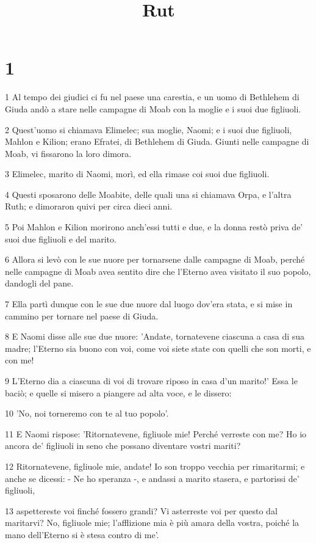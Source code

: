 

\title{Rut}


\chapter{1}

\par 1 Al tempo dei giudici ci fu nel paese una carestia, e un uomo di Bethlehem di Giuda andò a stare nelle campagne di Moab con la moglie e i suoi due figliuoli.
\par 2 Quest'uomo si chiamava Elimelec; sua moglie, Naomi; e i suoi due figliuoli, Mahlon e Kilion; erano Efratei, di Bethlehem di Giuda. Giunti nelle campagne di Moab, vi fissarono la loro dimora.
\par 3 Elimelec, marito di Naomi, morì, ed ella rimase coi suoi due figliuoli.
\par 4 Questi sposarono delle Moabite, delle quali una si chiamava Orpa, e l'altra Ruth; e dimoraron quivi per circa dieci anni.
\par 5 Poi Mahlon e Kilion morirono anch'essi tutti e due, e la donna restò priva de' suoi due figliuoli e del marito.
\par 6 Allora si levò con le sue nuore per tornarsene dalle campagne di Moab, perché nelle campagne di Moab avea sentito dire che l'Eterno avea visitato il suo popolo, dandogli del pane.
\par 7 Ella partì dunque con le sue due nuore dal luogo dov'era stata, e si mise in cammino per tornare nel paese di Giuda.
\par 8 E Naomi disse alle sue due nuore: 'Andate, tornatevene ciascuna a casa di sua madre; l'Eterno sia buono con voi, come voi siete state con quelli che son morti, e con me!
\par 9 L'Eterno dia a ciascuna di voi di trovare riposo in casa d'un marito!' Essa le baciò; e quelle si misero a piangere ad alta voce, e le dissero:
\par 10 'No, noi torneremo con te al tuo popolo'.
\par 11 E Naomi rispose: 'Ritornatevene, figliuole mie! Perché verreste con me? Ho io ancora de' figliuoli in seno che possano diventare vostri mariti?
\par 12 Ritornatevene, figliuole mie, andate! Io son troppo vecchia per rimaritarmi; e anche se dicessi: - Ne ho speranza -, e andassi a marito stasera, e partorissi de' figliuoli,
\par 13 aspettereste voi finché fossero grandi? Vi asterreste voi per questo dal maritarvi? No, figliuole mie; l'afflizione mia è più amara della vostra, poiché la mano dell'Eterno si è stesa contro di me'.
